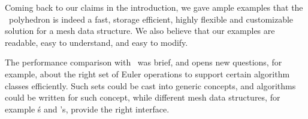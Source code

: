 Coming back to our claims in the introduction, we gave ample examples 
that the \cgal\ polyhedron is indeed a fast, storage efficient,
highly flexible and customizable solution for a mesh data
structure. We also believe that our examples are readable, easy to
understand, and easy to modify. 

The performance comparison with \openmesh\ was brief, and opens new
questions, for example, about the right set of Euler operations to
support certain algorithm classes efficiently. Such sets could be cast
into generic concepts, and algorithms could be written for such
concept, while different mesh data structures, for example \cgal\'s and
\openmesh's, provide the right interface.
